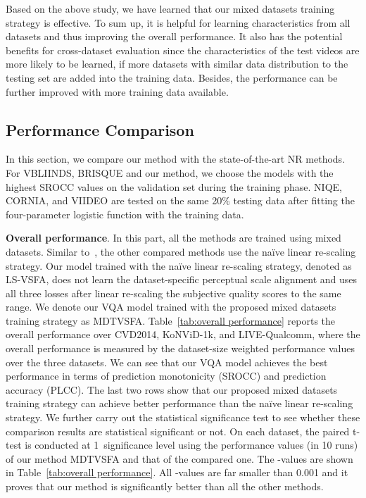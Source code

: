 \documentclass[twocolumn]{svjour3}          \smartqed  \usepackage{graphicx}
\begin{document}
Based on the above study, we have learned that our mixed datasets training strategy is effective. 
To sum up, it is helpful for learning characteristics from all datasets and thus improving the overall performance. 
It also has the potential benefits for cross-dataset evaluation since the characteristics of the test videos are more likely to be learned, if more datasets with similar data distribution to the testing set are added into the training data. 
Besides, the performance can be further improved with more training data available.

\subsection{Performance Comparison}
\label{sec:performance}
In this section, we compare our method with the state-of-the-art NR methods.
For VBLIINDS, BRISQUE and our method, we choose the models with the highest SROCC values on the validation set during the training phase. 
NIQE, CORNIA, and VIIDEO are tested on the same 20\% testing data after fitting the four-parameter logistic function with the training data.

\textbf{Overall performance}. 
In this part, all the methods are trained using mixed datasets. 
Similar to~\citet{korhonen2019two}, the other compared methods use the na\"ive linear re-scaling strategy. 
Our model trained with the na\"ive linear re-scaling strategy, denoted as LS-VSFA, does not learn the dataset-specific perceptual scale alignment and uses all three losses after linear re-scaling the subjective quality scores to the same range.
We denote our VQA model trained with the proposed mixed datasets training strategy as MDTVSFA. 
Table~\ref{tab:overall performance} reports the overall performance over CVD2014, KoNViD-1k, and LIVE-Qualcomm, where the overall performance is measured by the dataset-size weighted performance values over the three datasets. 
We can see that our VQA model achieves the best performance in terms of prediction monotonicity (SROCC) and prediction accuracy (PLCC). 
The last two rows show that our proposed mixed datasets training strategy can achieve better performance than the na\"ive linear re-scaling strategy.
We further carry out the statistical significance test to see whether these comparison results are statistical significant or not. 
On each dataset, the paired t-test is conducted at 1\textperthousand~significance level using the performance values (in 10 runs) of our method MDTVSFA and that of the compared one. 
The -values are shown in Table~\ref{tab:overall performance}. 
All -values are far smaller than 0.001 and it proves that our method is significantly better than all the other methods.
\end{document}
